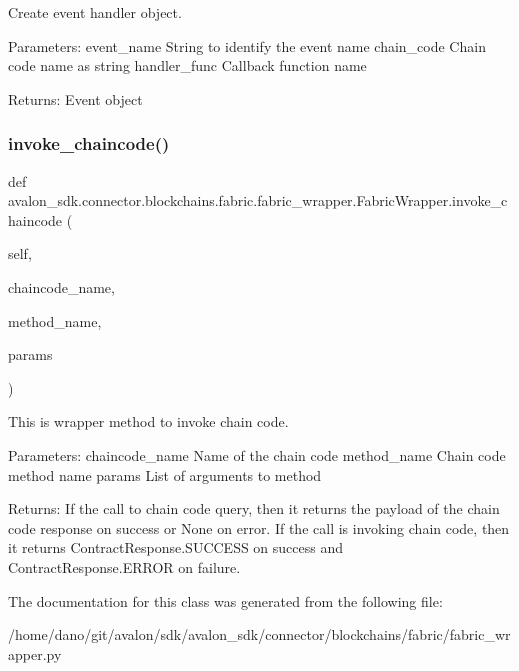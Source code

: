 \begin{DoxyVerb}Create event handler object.

Parameters:
event_name   String to identify the event name
chain_code   Chain code name as string
handler_func Callback function name

Returns:
Event object
\end{DoxyVerb}
 \mbox{\label{classavalon__sdk_1_1connector_1_1blockchains_1_1fabric_1_1fabric__wrapper_1_1FabricWrapper_a41077495e7368ce960a363f95ec94428}} 
\subsubsection{\texorpdfstring{invoke\+\_\+chaincode()}{invoke\_chaincode()}}
{\footnotesize\ttfamily def avalon\+\_\+sdk.\+connector.\+blockchains.\+fabric.\+fabric\+\_\+wrapper.\+Fabric\+Wrapper.\+invoke\+\_\+chaincode (\begin{DoxyParamCaption}\item[{}]{self,  }\item[{}]{chaincode\+\_\+name,  }\item[{}]{method\+\_\+name,  }\item[{}]{params }\end{DoxyParamCaption})}

\begin{DoxyVerb}This is wrapper method to invoke chain code.

Parameters:
chaincode_name Name of the chain code
method_name    Chain code method name
params         List of arguments to method

Returns:
If the call to chain code query, then it
returns the payload of the chain code response
on success or None on error.
If the call is invoking chain code, then it
returns ContractResponse.SUCCESS on success
and ContractResponse.ERROR on failure.
\end{DoxyVerb}
 

The documentation for this class was generated from the following file\+:\begin{DoxyCompactItemize}
\item 
/home/dano/git/avalon/sdk/avalon\+\_\+sdk/connector/blockchains/fabric/fabric\+\_\+wrapper.\+py\end{DoxyCompactItemize}
